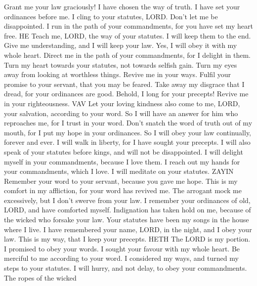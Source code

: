 Grant me your law graciously!  I have chosen the way of
truth. I have set your ordinances before me.  I cling to
your statutes, LORD. Don't let me be disappointed.  I run
in the path of your commandments, for you have set my heart free. HE
 Teach me, LORD, the way of your statutes. I will keep them
to the end.  Give me understanding, and I will keep your
law. Yes, I will obey it with my whole heart.  Direct me in
the path of your commandments, for I delight in them.  Turn
my heart towards your statutes, not towards selfish gain. 
Turn my eyes away from looking at worthless things. Revive me in your
ways.  Fulfil your promise to your servant, that you may be
feared.  Take away my disgrace that I dread, for your
ordinances are good.  Behold, I long for your precepts!
Revive me in your righteousness. VAV  Let your loving
kindness also come to me, LORD, your salvation, according to your word.
 So I will have an answer for him who reproaches me, for I
trust in your word.  Don't snatch the word of truth out of
my mouth, for I put my hope in your ordinances.  So I will
obey your law continually, forever and ever.  I will walk
in liberty, for I have sought your precepts.  I will also
speak of your statutes before kings, and will not be disappointed.
 I will delight myself in your commandments, because I love
them.  I reach out my hands for your commandments, which I
love. I will meditate on your statutes. ZAYIN  Remember
your word to your servant, because you gave me hope.  This
is my comfort in my affliction, for your word has revived me.
 The arrogant mock me excessively, but I don't swerve from
your law.  I remember your ordinances of old, LORD, and
have comforted myself.  Indignation has taken hold on me,
because of the wicked who forsake your law.  Your statutes
have been my songs in the house where I live.  I have
remembered your name, LORD, in the night, and I obey your law.
 This is my way, that I keep your precepts. HETH
 The LORD is my portion. I promised to obey your words.
 I sought your favour with my whole heart. Be merciful to
me according to your word.  I considered my ways, and
turned my steps to your statutes.  I will hurry, and not
delay, to obey your commandments.  The ropes of the wicked
